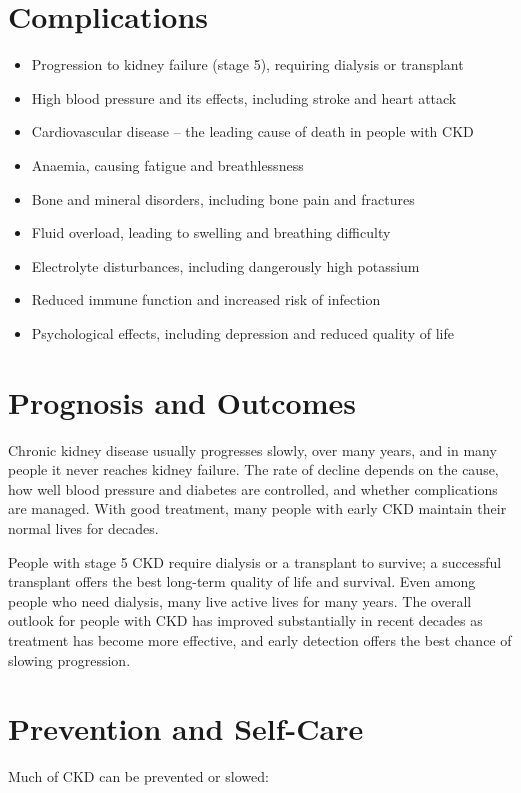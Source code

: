 \section*{Complications}
\begin{itemize}
    \item Progression to kidney failure (stage 5), requiring dialysis or transplant
    \item High blood pressure and its effects, including stroke and heart attack
    \item Cardiovascular disease -- the leading cause of death in people with CKD
    \item Anaemia, causing fatigue and breathlessness
    \item Bone and mineral disorders, including bone pain and fractures
    \item Fluid overload, leading to swelling and breathing difficulty
    \item Electrolyte disturbances, including dangerously high potassium
    \item Reduced immune function and increased risk of infection
    \item Psychological effects, including depression and reduced quality of life
\end{itemize}

\section*{Prognosis and Outcomes}
Chronic kidney disease usually progresses slowly, over many years, and in many people it never reaches kidney failure. The rate of decline depends on the cause, how well blood pressure and diabetes are controlled, and whether complications are managed. With good treatment, many people with early CKD maintain their normal lives for decades.

People with stage 5 CKD require dialysis or a transplant to survive; a successful transplant offers the best long-term quality of life and survival. Even among people who need dialysis, many live active lives for many years. The overall outlook for people with CKD has improved substantially in recent decades as treatment has become more effective, and early detection offers the best chance of slowing progression.

\section*{Prevention and Self-Care}
Much of CKD can be prevented or slowed:

